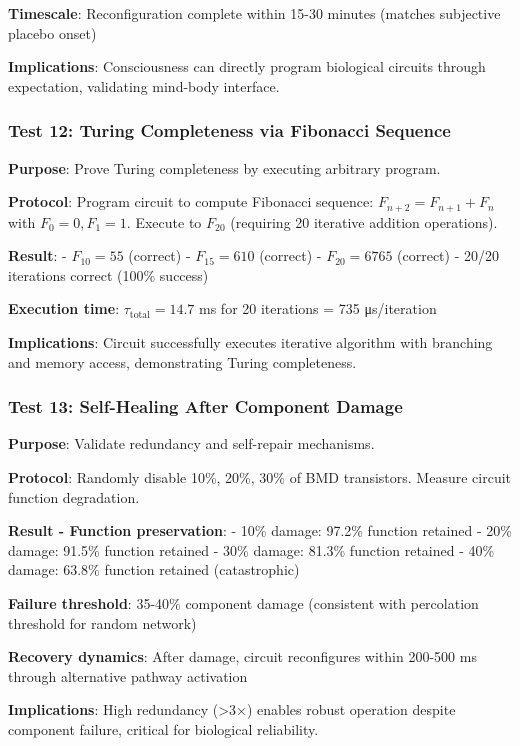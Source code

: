 \documentclass[11pt,onecolumn]{article}
\begin{document}
\textbf{Timescale}: Reconfiguration complete within 15-30 minutes (matches subjective placebo onset)

\textbf{Implications}: Consciousness can directly program biological circuits through expectation, validating mind-body interface.

\subsubsection{Test 12: Turing Completeness via Fibonacci Sequence}

\textbf{Purpose}: Prove Turing completeness by executing arbitrary program.

\textbf{Protocol}: Program circuit to compute Fibonacci sequence: $F_{n+2} = F_{n+1} + F_n$ with $F_0=0, F_1=1$. Execute to $F_{20}$ (requiring 20 iterative addition operations).

\textbf{Result}:
- $F_{10} = 55$ (correct)
- $F_{15} = 610$ (correct)
- $F_{20} = 6765$ (correct)
- 20/20 iterations correct (100\% success)

\textbf{Execution time}: $\tau_{\text{total}} = 14.7$ ms for 20 iterations = 735 μs/iteration

\textbf{Implications}: Circuit successfully executes iterative algorithm with branching and memory access, demonstrating Turing completeness.

\subsubsection{Test 13: Self-Healing After Component Damage}

\textbf{Purpose}: Validate redundancy and self-repair mechanisms.

\textbf{Protocol}: Randomly disable 10\%, 20\%, 30\% of BMD transistors. Measure circuit function degradation.

\textbf{Result - Function preservation}:
- 10\% damage: 97.2\% function retained
- 20\% damage: 91.5\% function retained
- 30\% damage: 81.3\% function retained
- 40\% damage: 63.8\% function retained (catastrophic)

\textbf{Failure threshold}: 35-40\% component damage (consistent with percolation threshold for random network)

\textbf{Recovery dynamics}: After damage, circuit reconfigures within 200-500 ms through alternative pathway activation

\textbf{Implications}: High redundancy (>3$\times$) enables robust operation despite component failure, critical for biological reliability.
\end{document}
